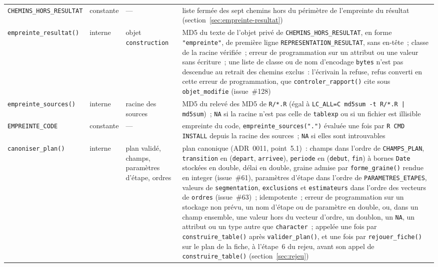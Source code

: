 \documentclass[a4paper,11pt]{article}
\newcommand{\code}[1]{\texttt{\small #1}}
\newcommand{\catalogue}[2]{\code{#2}}
\begin{document}
{\begin{longtable}{@{}p{6.2cm}p{1.4cm}p{2.6cm}p{4.4cm}@{}}
\catalogue{fonctions-rapport}{CHEMINS\_HORS\_RESULTAT} & constante & --- & liste fermée des sept chemins hors du périmètre de l'empreinte du résultat (section~\ref{sec:empreinte-resultat}) \\
\catalogue{fonctions-rapport}{empreinte\_resultat()} & interne & objet \code{construction} & MD5 du texte de l'objet privé de \code{CHEMINS\_HORS\_RESULTAT}, en forme \code{"empreinte"}, de première ligne \code{REPRESENTATION\_RESULTAT}, sans en-tête~; classe de la racine vérifiée~; erreur de programmation sur un attribut ou une valeur sans écriture~; une liste de classe ou de nom d'encodage \code{bytes} n'est pas descendue au retrait des chemins exclus~: l'écrivain la refuse, refus converti en cette erreur de programmation, que \code{controler\_rapport()} cite sous \code{objet\_modifie} (issue~\#128) \\
\catalogue{fonctions-rapport}{empreinte\_sources()} & interne & racine des sources & MD5 du relevé des MD5 de \code{R/*.R} (égal à \code{LC\_ALL=C md5sum -t R/*.R | md5sum})~; \code{NA} si la racine n'est pas celle de \code{tablexp} ou si un fichier est illisible \\
\catalogue{fonctions-rapport}{EMPREINTE\_CODE} & constante & --- & empreinte du code, \code{empreinte\_sources(".")} évaluée une fois par \code{R CMD INSTALL} depuis la racine des sources~; \code{NA} si elles sont introuvables \\
\catalogue{fonctions-rapport}{canoniser\_plan()} & interne & plan validé, champs, paramètres d'étape, ordres & plan canonique (ADR~0011, point~5.1)~: champs dans l'ordre de \code{CHAMPS\_PLAN}, \code{transition} en (\code{depart}, \code{arrivee}), \code{periode} en (\code{debut}, \code{fin}) à bornes \code{Date} stockées en double, délai en double, graine admise par \code{forme\_graine()} rendue en integer (issue~\#61), paramètres d'étape dans l'ordre de \code{PARAMETRES\_ETAPES}, valeurs de \code{segmentation}, \code{exclusions} et \code{estimateurs} dans l'ordre des vecteurs de \code{ordres} (issue~\#63)~; idempotente~; erreur de programmation sur un stockage non prévu, un nom d'étape ou de paramètre en double, ou, dans un champ ensemble, une valeur hors du vecteur d'ordre, un doublon, un \code{NA}, un attribut ou un type autre que \code{character}~; appelée une fois par \code{construire\_table()} après \code{valider\_plan()}, et une fois par \code{rejouer\_fiche()} sur le plan de la fiche, à l'étape~6 du rejeu, avant son appel de \code{construire\_table()} (section~\ref{sec:rejeu}) \\

\end{longtable}}
\end{document}

